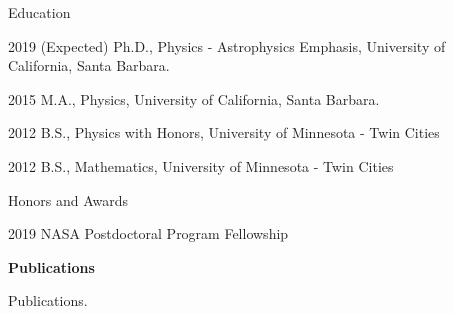 \begin{vitae}

\begin{vitaesection}{Education}
\vspace{-0.1cm}
\item [2019]	(Expected) Ph.D., Physics - Astrophysics Emphasis, University of California, Santa Barbara.
\item [2015]	M.A., Physics, University of California, Santa Barbara.
\item [2012]	B.S., Physics with Honors, University of Minnesota - Twin Cities
\item [2012]	B.S., Mathematics, University of Minnesota - Twin Cities
\end{vitaesection}

\begin{vitaesection}{Honors and Awards}
\vspace{-0.1cm}
\item [2019]    NASA Postdoctoral Program Fellowship
\end{vitaesection}

\textbf{Publications}

Publications.

\end{vitae}